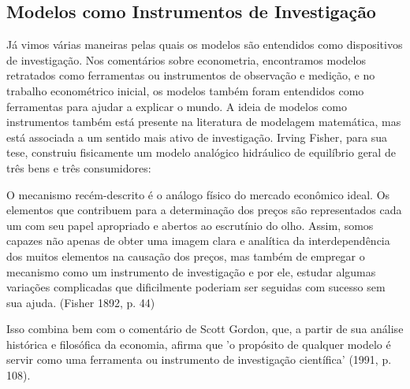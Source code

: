 \documentclass[12pt]{article}
\begin{document}
\subsection{\textbf{Modelos como Instrumentos de Investigação}}

Já vimos várias maneiras pelas quais os modelos são entendidos como dispositivos de investigação. Nos comentários sobre econometria, encontramos modelos retratados como ferramentas ou instrumentos de observação e medição, e no trabalho econométrico inicial, os modelos também foram entendidos como ferramentas para ajudar a explicar o mundo. A ideia de modelos como instrumentos também está presente na literatura de modelagem matemática, mas está associada a um sentido mais ativo de investigação. Irving Fisher, para sua tese, construiu fisicamente um modelo analógico hidráulico de equilíbrio geral de três bens e três consumidores:

O mecanismo recém-descrito é o análogo físico do mercado econômico ideal. Os elementos que contribuem para a determinação dos preços são representados cada um com seu papel apropriado e abertos ao escrutínio do olho. Assim, somos capazes não apenas de obter uma imagem clara e analítica da interdependência dos muitos elementos na causação dos preços, mas também de empregar o mecanismo como um instrumento de investigação e por ele, estudar algumas variações complicadas que dificilmente poderiam ser seguidas com sucesso sem sua ajuda. (Fisher 1892, p. 44)

Isso combina bem com o comentário de Scott Gordon, que, a partir de sua análise histórica e filosófica da economia, afirma que 'o propósito de qualquer modelo é servir como uma ferramenta ou instrumento de investigação científica' (1991, p. 108).
\end{document}
